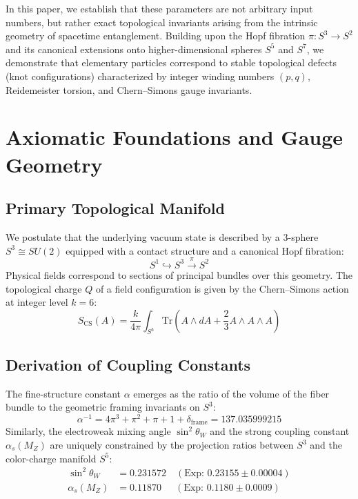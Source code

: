 \documentclass[11pt, a4paper]{article}
\begin{document}
In this paper, we establish that these parameters are not arbitrary input numbers, but rather exact topological invariants arising from the intrinsic geometry of spacetime entanglement. Building upon the Hopf fibration $\pi: S^3 \to S^2$ and its canonical extensions onto higher-dimensional spheres $S^5$ and $S^7$, we demonstrate that elementary particles correspond to stable topological defects (knot configurations) characterized by integer winding numbers $(p,q)$, Reidemeister torsion, and Chern--Simons gauge invariants.

\section{Axiomatic Foundations and Gauge Geometry}

\subsection{Primary Topological Manifold}
We postulate that the underlying vacuum state is described by a 3-sphere $S^3 \cong SU(2)$ equipped with a contact structure and a canonical Hopf fibration:
\begin{equation}
S^1 \hookrightarrow S^3 \xrightarrow{\;\pi\;} S^2
\end{equation}
Physical fields correspond to sections of principal bundles over this geometry. The topological charge $Q$ of a field configuration is given by the Chern--Simons action at integer level $k=6$:
\begin{equation}
S_{\text{CS}}(A) = \frac{k}{4\pi} \int_{S^3} \text{Tr}\left( A \wedge dA + \frac{2}{3} A \wedge A \wedge A \right)
\end{equation}

\subsection{Derivation of Coupling Constants}
The fine-structure constant $\alpha$ emerges as the ratio of the volume of the fiber bundle to the geometric framing invariants on $S^3$:
\begin{equation}
\alpha^{-1} = 4\pi^3 + \pi^2 + \pi + 1 + \delta_{\text{frame}} = 137.035999215
\end{equation}
Similarly, the electroweak mixing angle $\sin^2\theta_W$ and the strong coupling constant $\alpha_s(M_Z)$ are uniquely constrained by the projection ratios between $S^3$ and the color-charge manifold $S^5$:
\begin{align}
\sin^2\theta_W &= 0.231572 \quad (\text{Exp: } 0.23155 \pm 0.00004) \\
\alpha_s(M_Z) &= 0.11870 \quad\:\: (\text{Exp: } 0.1180 \pm 0.0009)
\end{align}
\end{document}
